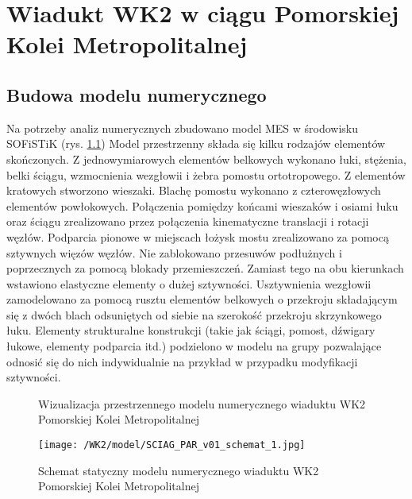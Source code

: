 \chapter{Wiadukt WK2 w ciągu Pomorskiej Kolei Metropolitalnej}
\section{Budowa modelu numerycznego}

Na potrzeby analiz numerycznych zbudowano model MES w środowisku SOFiSTiK (rys. \ref{fig: model_wk2_visualization}) Model przestrzenny składa się kilku rodzajów elementów skończonych. Z jednowymiarowych elementów belkowych wykonano łuki, stężenia, belki ściągu, wzmocnienia wezgłowii i żebra pomostu ortotropowego. Z elementów kratowych stworzono wieszaki. Blachę pomostu wykonano z czterowęzłowych elementów powłokowych. Połączenia pomiędzy końcami wieszaków i osiami łuku oraz ściągu zrealizowano przez połączenia kinematyczne translacji i rotacji węzłów. Podparcia pionowe w miejscach łożysk mostu zrealizowano za pomocą sztywnych więzów węzłów. Nie zablokowano przesuwów podłużnych i poprzecznych za pomocą blokady przemieszczeń. Zamiast tego na obu kierunkach wstawiono elastyczne elementy o dużej sztywności. Usztywnienia wezgłowii zamodelowano za pomocą rusztu elementów belkowych o przekroju składającym się z dwóch blach odsuniętych od siebie na szerokość przekroju skrzynkowego łuku. Elementy strukturalne konstrukcji (takie jak ściągi, pomost, dźwigary łukowe, elementy podparcia itd.) podzielono w modelu na grupy pozwalające odnosić się do nich indywidualnie na przykład w przypadku modyfikacji sztywności.
\begin{figure}[h]
	\centering
	\captionsetup{justification=centering}
	\caption{Wizualizacja przestrzennego modelu numerycznego wiaduktu WK2 Pomorskiej Kolei Metropolitalnej}
	\label{fig: model_wk2_visualization}
\end{figure}
\begin{figure}[h]
	\centering
	\texttt{[image: /WK2/model/SCIAG\_PAR\_v01\_schemat\_1.jpg]}
	\captionsetup{justification=centering}
	\caption{Schemat statyczny modelu numerycznego wiaduktu WK2 Pomorskiej Kolei Metropolitalnej}
	\label{fig: model_wk2_static_scheme}
\end{figure}

